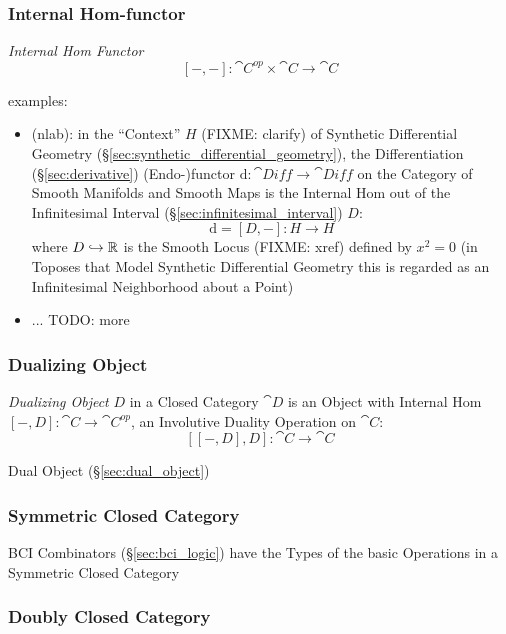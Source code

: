 \subsubsection{Internal Hom-functor}\label{sec:internal_hom}

\emph{Internal Hom Functor}
\[
  [-,-] : \cat{C}^{op} \times \cat{C} \rightarrow \cat{C}
\]

examples:
\begin{itemize}
  \item (nlab): in the ``Context'' $H$ (FIXME: clarify) of Synthetic
    Differential Geometry (\S\ref{sec:synthetic_differential_geometry}), the
    Differentiation (\S\ref{sec:derivative}) (Endo-)functor $\mathrm{d} :
    \cat{Diff} \rightarrow \cat{Diff}$ on the Category of Smooth Manifolds and
    Smooth Maps is the Internal Hom out of the Infinitesimal Interval
    (\S\ref{sec:infinitesimal_interval}) $D$:
    \[
      \mathrm{d} = [D,-] : H \rightarrow H
    \]
    where $D \hookrightarrow \mathbb{R}$ is the Smooth Locus (FIXME: xref) defined
    by $x^2 = 0$ (in Toposes that Model Synthetic Differential Geometry this is
    regarded as an Infinitesimal Neighborhood about a Point)
  \item ... TODO: more
\end{itemize}



\subsubsection{Dualizing Object}\label{sec:dualizing_object}

\emph{Dualizing Object} $D$ in a Closed Category $\cat{D}$ is an
Object with Internal Hom $[-,D]: \cat{C} \rightarrow \cat{C}^{op}$, an
Involutive Duality Operation on $\cat{C}$: %
\[
  [[-,D],D]: \cat{C} \rightarrow \cat{C}
\]

Dual Object (\S\ref{sec:dual_object})



\subsubsection{Symmetric Closed Category}
\label{sec:symmetric_closed_category}

BCI Combinators (\S\ref{sec:bci_logic}) have the Types of the basic
Operations in a Symmetric Closed Category



\subsubsection{Doubly Closed Category}\label{sec:doubly_closed_category}

